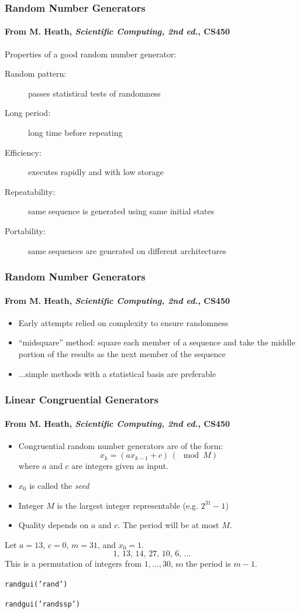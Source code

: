 \documentclass[10pt]{beamer}
\begin{document}
\begin{frame}
\frametitle{Random Number Generators}
\framesubtitle{From M. Heath, \emph{Scientific Computing, 2nd ed.}, CS450}
Properties of a good random number generator:
\begin{description}
    \item[Random pattern:]  passes statistical tests of randomness
    \item[Long period:] long time before repeating
    \item[Efficiency:] executes rapidly and with low storage
    \item[Repeatability:] same sequence is generated using same initial states
    \item[Portability:] same sequences are generated on different architectures
\end{description}
\end{frame}
\begin{frame}
\frametitle{Random Number Generators}
\framesubtitle{From M. Heath, \emph{Scientific Computing, 2nd ed.}, CS450}
\begin{itemize}
    \item Early attempts relied on complexity to ensure randomness
    \item ``midsquare'' method: square each member of a sequence and take the
middle portion of the results as the next member of the sequence
    \item ...simple methods with a statistical basis are preferable
\end{itemize}
\end{frame}
\begin{frame}
\frametitle{Linear Congruential Generators}
\framesubtitle{From M. Heath, \emph{Scientific Computing, 2nd ed.}, CS450}
\begin{itemize}
    \item Congruential random number generators are of the form:
\[
x_k = (a x_{k-1} + c)\, (\mod M)
\]
where $a$ and $c$ are integers given as input.
    \item $x_0$ is called the \emph{seed}
    \item Integer $M$ is the largest integer representable (e.g. $2^{31} -1$)
    \item Quality depends on $a$ and $c$.  The period will be at most $M$.
\end{itemize}
\begin{example}
Let $a=13$, $c=0$, $m=31$, and $x_0=1$.
\[
1,\, 13,\, 14,\, 27,\, 10,\, 6,\, \dots
\]
This is a permutation of integers from $1,\dots,30$, so the period is $m-1$.
\end{example}
\bigskip

\texttt{randgui('rand')}

\texttt{randgui('randssp')}
\end{frame}
\end{document}
